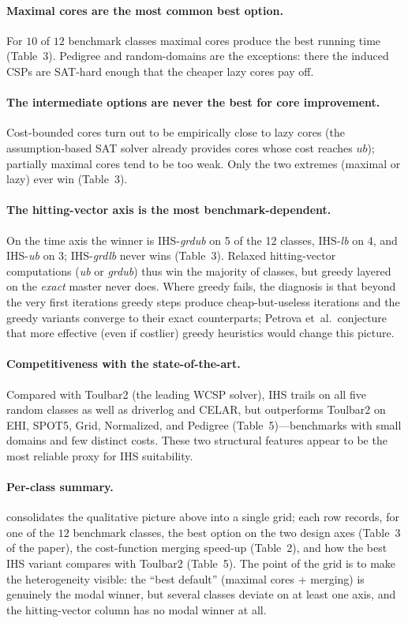 \paragraph{Maximal cores are the most common best option.} For $10$ of $12$
benchmark classes maximal cores produce the best running time (Table~3).
Pedigree and random-domains are the exceptions: there the induced CSPs are
SAT-hard enough that the cheaper lazy cores pay off.

\paragraph{The intermediate options are never the best for core improvement.}
Cost-bounded cores turn out to be empirically close to lazy cores (the
assumption-based SAT solver already provides cores whose cost reaches
$\mathit{ub}$); partially maximal cores tend to be too weak. Only the two
extremes (maximal or lazy) ever win (Table~3).

\paragraph{The hitting-vector axis is the most benchmark-dependent.} On the
time axis the winner is IHS-\emph{grdub} on 5 of the 12 classes,
IHS-\emph{lb} on 4, and IHS-\emph{ub} on 3; IHS-\emph{grdlb} never wins
(Table~3). Relaxed hitting-vector computations (\emph{ub} or \emph{grdub})
thus win the majority of classes, but greedy layered on the \emph{exact}
master never does. Where greedy fails, the diagnosis is that beyond the very
first iterations greedy steps produce cheap-but-useless iterations and the
greedy variants converge to their exact counterparts; Petrova et~al.\
conjecture that more effective (even if costlier) greedy heuristics would
change this picture.

\paragraph{Competitiveness with the state-of-the-art.} Compared with Toulbar2
(the leading WCSP solver), IHS trails on all five random classes as well as
driverlog and CELAR, but outperforms Toulbar2 on EHI, SPOT5, Grid,
Normalized, and Pedigree (Table~5)---benchmarks with small domains and few
distinct costs. These two structural features appear to be the most
reliable proxy for IHS suitability.

\paragraph{Per-class summary.}  consolidates the
qualitative picture above into a single grid; each row records, for one of
the $12$ benchmark classes, the best option on the two design axes (Table~3
of the paper), the cost-function merging speed-up (Table~2), and how the
best IHS variant compares with Toulbar2 (Table~5). The point of the grid is
to make the heterogeneity visible: the ``best default'' (maximal cores +
merging) is genuinely the modal winner, but several classes deviate on at
least one axis, and the hitting-vector column has no modal winner at all.

